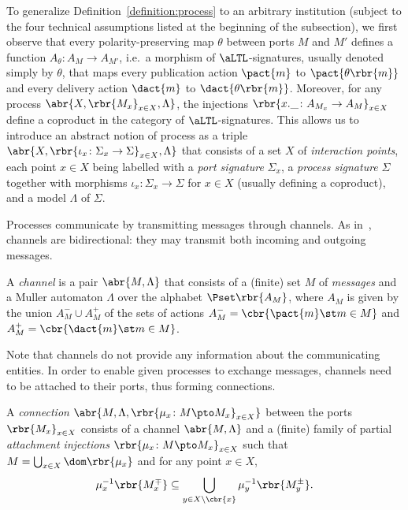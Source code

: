 \documentclass{LMCS}
\begin{document}
  \begin{rem}
    \label{remark:abstract-process}
    To generalize Definition~\ref{definition:process} to an arbitrary institution (subject to the four technical assumptions listed at the beginning of the subsection), we first observe that every polarity-preserving map \(\theta\) between ports \(M\) and \(M'\) defines a function \(A_{\theta} \colon A_{M} \to A_{M'}\), i.e.\ a morphism of \(\aLTL\)\nb-signatures, usually denoted simply by \(\theta\), that maps every publication action \(\pact{m}\) to \(\pact{\theta\rbr{m}}\) and every delivery action \(\dact{m}\) to \(\dact{\theta\rbr{m}}\).
    Moreover, for any process \(\abr{X, \rbr{M_{x}}_{x \in X}, \Lambda}\), the injections \(\rbr{x.\_ \colon A_{M_{x}} \to A_{M}}_{x \in X}\) define a coproduct in the category of \(\aLTL\)\nb-signatures.
    This allows us to introduce an abstract notion of process as a triple \(\abr{X, \rbr{\iota_{x} \colon \Sigma_{x} \to \Sigma}_{x \in X}, \Lambda}\) that consists of a set \(X\) of \emph{interaction points}, each point \(x \in X\) being labelled with a \emph{port signature} \(\Sigma_{x}\), a \emph{process signature} \(\Sigma\) together with morphisms \(\iota_{x} \colon \Sigma_{x} \to \Sigma\) for \(x \in X\) (usually defining a coproduct), and a model \(\Lambda\) of \(\Sigma\).
  \end{rem}

  Processes communicate by transmitting messages through channels. As in~\cite{Brand-Zafiropulo:Communicating-finite-state-machines-1983,Fiadeiro-Lopes:An-interface-theory-for-service-oriented-design-2013}, channels are bidirectional: they may transmit both incoming and outgoing messages.

  \begin{defi}[Channel]
    \label{definition:channel}
    A \emph{channel} is a pair \(\abr{M, \Lambda}\) that consists of a (finite) set \(M\) of \emph{messages} and a Muller automaton \(\Lambda\) over the alphabet \(\Pset\rbr{A_{M}}\), where \(A_{M}\) is given by the union \(A_{M}^{-} \cup A_{M}^{+}\) of the sets of actions \(A_{M}^{-} = \cbr{\pact{m} \st m \in M}\) and \(A_{M}^{+} = \cbr{\dact{m} \st m \in M}\).
  \end{defi}

  Note that channels do not provide any information about the communicating entities.  In order to enable given processes to exchange messages, channels need to be attached to their ports, thus forming connections.

  \begin{defi}[Connection]
    \label{definition:connection}
    A \emph{connection} \(\abr{M, \Lambda, \rbr{\mu_{x} \colon M \pto M_{x}}_{x \in X}}\) between the ports \(\rbr{M_{x}}_{x \in X}\) consists of a channel \(\abr{M, \Lambda}\) and a (finite) family of partial \emph{attachment injections} \(\rbr{\mu_{x} \colon M \pto M_{x}}_{x \in X}\) such that \(M = \bigcup_{x \in X} \dom\rbr{\mu_{x}}\) and for any point \(x \in X\),
    \[
    \mu_{x}^{-1}\rbr{M_{x}^{\mp}} \subseteq \bigcup_{y \in X \setminus \cbr{x}} \mu_{y}^{-1}\rbr{M_{y}^{\pm}}.
    \]
  \end{defi}
\end{document}
